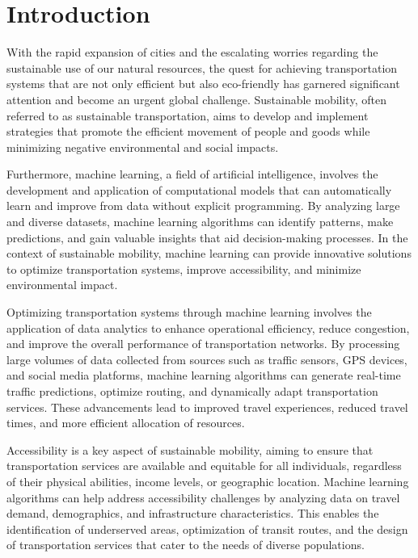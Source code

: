 %
\chapter{Introduction}
\label{sec:intro}
With the rapid expansion of cities and the escalating worries regarding the sustainable use of our natural resources, the quest for achieving transportation systems that are not only efficient but also eco-friendly has garnered significant attention and become an urgent global challenge. 
Sustainable mobility, often referred to as sustainable transportation, aims to develop and implement strategies that promote the efficient movement of people and goods while minimizing negative environmental and social impacts. 

Furthermore, machine learning, a field of artificial intelligence, involves the development and application of computational models that can automatically learn and improve from data without explicit programming. By analyzing large and diverse datasets, machine learning algorithms can identify patterns, make predictions, and gain valuable insights that aid decision-making processes. In the context of sustainable mobility, machine learning can provide innovative solutions to optimize transportation systems, improve accessibility, and minimize environmental impact.

Optimizing transportation systems through machine learning involves the application of data analytics to enhance operational efficiency, reduce congestion, and improve the overall performance of transportation networks. By processing large volumes of data collected from sources such as traffic sensors, GPS devices, and social media platforms, machine learning algorithms can generate real-time traffic predictions, optimize routing, and dynamically adapt transportation services. These advancements lead to improved travel experiences, reduced travel times, and more efficient allocation of resources.

Accessibility is a key aspect of sustainable mobility, aiming to ensure that transportation services are available and equitable for all individuals, regardless of their physical abilities, income levels, or geographic location. Machine learning algorithms can help address accessibility challenges by analyzing data on travel demand, demographics, and infrastructure characteristics. This enables the identification of underserved areas, optimization of transit routes, and the design of transportation services that cater to the needs of diverse populations.


